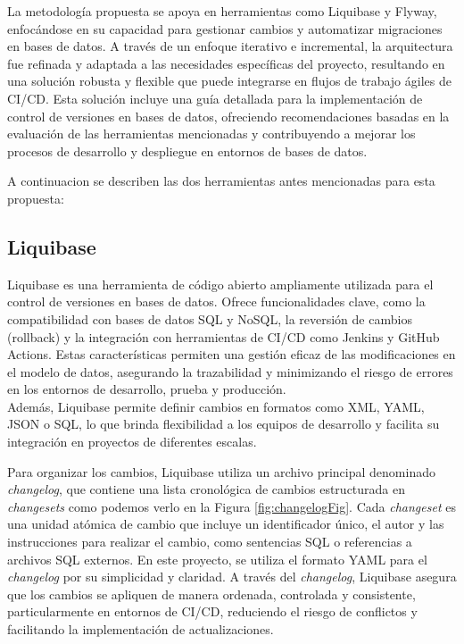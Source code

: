 \documentclass{IEEEtran}
\begin{document}
La metodología propuesta se apoya en herramientas como Liquibase y Flyway, enfocándose en su capacidad para gestionar cambios y automatizar migraciones en bases de datos. A través de un enfoque iterativo e incremental, la arquitectura fue refinada y adaptada a las necesidades específicas del proyecto, resultando en una solución robusta y flexible que puede integrarse en flujos de trabajo ágiles de CI/CD. Esta solución incluye una guía detallada para la implementación de control de versiones en bases de datos, ofreciendo recomendaciones basadas en la evaluación de las herramientas mencionadas y contribuyendo a mejorar los procesos de desarrollo y despliegue en entornos de bases de datos.

A continuacion se describen las dos herramientas antes mencionadas para esta propuesta:
\subsection{Liquibase}
Liquibase es una herramienta de código abierto ampliamente utilizada para el control de versiones en bases de datos. Ofrece funcionalidades clave, como la compatibilidad con bases de datos SQL y NoSQL, la reversión de cambios (rollback) y la integración con herramientas de CI/CD como Jenkins y GitHub Actions. Estas características permiten una gestión eficaz de las modificaciones en el modelo de datos, asegurando la trazabilidad y minimizando el riesgo de errores en los entornos de desarrollo, prueba y producción.\\ Además, Liquibase permite definir cambios en formatos como XML, YAML, JSON o SQL, lo que brinda flexibilidad a los equipos de desarrollo y facilita su integración en proyectos de diferentes escalas.

Para organizar los cambios, Liquibase utiliza un archivo principal denominado \textit{changelog}, que contiene una lista cronológica de cambios estructurada en \textit{changesets} como podemos verlo en la Figura \ref{fig:changelogFig}. Cada \textit{changeset} es una unidad atómica de cambio que incluye un identificador único, el autor y las instrucciones para realizar el cambio, como sentencias SQL o referencias a archivos SQL externos. En este proyecto, se utiliza el formato YAML para el \textit{changelog} por su simplicidad y claridad. A través del \textit{changelog}, Liquibase asegura que los cambios se apliquen de manera ordenada, controlada y consistente, particularmente en entornos de CI/CD, reduciendo el riesgo de conflictos y facilitando la implementación de actualizaciones.
\end{document}
